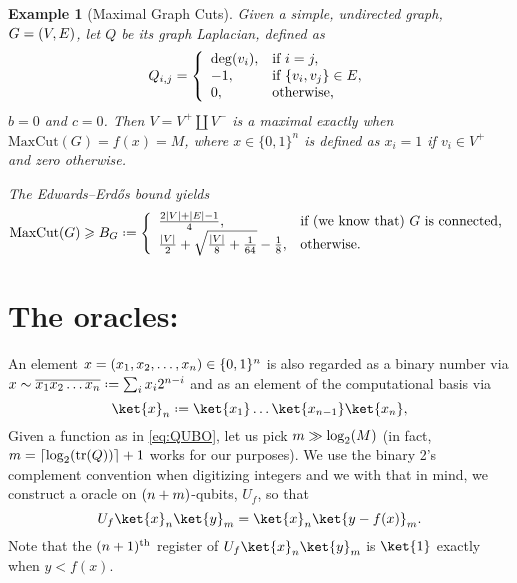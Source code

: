 \documentclass[reqno,oneside,12pt]{amsart}  %
\numberwithin{equation}{section}                %
\let\originalleft\left
\let\originalright\right
\renewcommand{\left}{\mathopen{}\mathclose\bgroup\originalleft}
\renewcommand{\right}{\aftergroup\egroup\originalright}
\def\({\mathopen{}\left(}
\def\){\right)\mathclose{}}
\newcommand*{\eqdef}{\mathrel{\vcenter{\baselineskip0.5ex \lineskiplimit0pt\hbox{.}\hbox{.}}}=}
\newtheorem{example}[theorem]{Example}
\def\tr{\mathrm{tr}}
\begin{document}
\begin{example}[Maximal Graph Cuts]
   Given a simple, undirected graph, $G = \( V, E \)$, let $Q$ be its graph Laplacian, defined as
   \begin{equation}
      Q_{i, j} = \left\{ \begin{array}{ll} \deg \( v_i \), & \mbox{if } i = j, \\ - 1, & \mbox{if } \{ v_i, v_j \} \in E, \\ 0, & \mbox{otherwise,} \end{array} \right.
   \end{equation}
   $b = 0$ and $c = 0$. Then $V = V^+ \coprod V^-$ is a maximal exactly when $\mathrm{MaxCut} (G) = f(x) = M$, where $x \in \{ 0, 1 \}^n$ is defined as $x_i = 1$ if $v_i \in V^+$ and zero otherwise.

   The Edwards--Erd\H{o}s bound yields
   \begin{equation}
      \mathrm{MaxCut} (G) \geqslant B_G \eqdef \left\{ \begin{array}{ll} \frac{2 |V| + |E| - 1}{4}, & \mbox{if (we know that) $G$ is connected,} \\ \frac{|V|}{2} + \sqrt{\tfrac{|V|}{8} + \tfrac{1}{64}} - \frac{1}{8}, & \mbox{otherwise.} \end{array} \right.
   \end{equation}
\end{example}

\bigskip

\section{The oracles:}

An element $x = \( x_1, x_2, \ldots, x_n \) \in \{ 0, 1 \}^n$ is also regarded as a binary number via $x \sim \overline{x_1 x_2 \ldots x_n} \eqdef \sum_i x_i 2^{n - i}$ and as an element of the computational basis via
\begin{equation}
   \ket{x}_n \eqdef \ket{x_1} \ldots \ket{x_{n - 1}} \ket{x_n},
\end{equation}
Given a function as in \cref{eq:QUBO}, let us pick $m \gg \log_2 \( M \)$ (in fact, $m = \left\lceil \log_2 \( \tr \( Q \) \) \right\rceil + 1$ works for our purposes). We use the binary 2’s complement convention when digitizing integers and we with that in mind, we construct a oracle on $\( n + m \)$-qubits, $U_f$, so that
\begin{equation}
   U_f \ket{x}_n \ket{y}_m = \ket{x}_n \ket{y - f (x)}_m.
\end{equation}
Note that the $\( n + 1 \)^{\mathrm{th}}$ register of $U_f \ket{x}_n \ket{y}_m$ is $\ket{1}$ exactly when $y < f (x)$.
\end{document}
